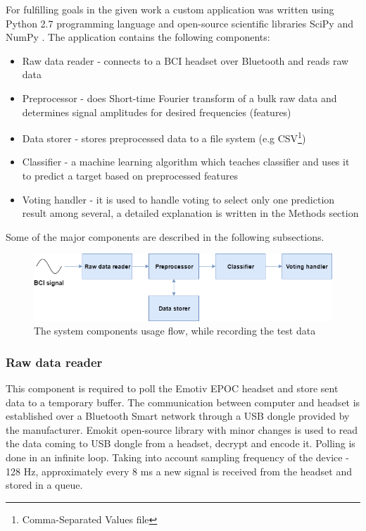 \documentclass[12pt]{article}
\theoremstyle{definition}
\begin{document}
For fulfilling goals in the given work a custom application was written using Python 2.7 programming language and open-source scientific libraries SciPy \cite{scipy} and NumPy \cite{numpy}. The application contains the following components:
\begin{itemize}
\item Raw data reader - connects to a BCI headset over Bluetooth and reads raw data
\item Preprocessor -  does Short-time Fourier transform of a bulk raw data and determines signal amplitudes for desired frequencies (features)
\item Data storer - stores preprocessed data to a file system (e.g CSV\footnote{Comma-Separated Values \cite{csv} file})
\item Classifier - a machine learning algorithm which teaches classifier and uses it to predict a target based on preprocessed features
\item Voting handler - it is used to handle voting to select only one prediction result among several, a detailed explanation is written in the Methods section
\end{itemize}

Some of the major components are described in the following subsections.
\begin{figure} [ht]
\begin{center}
\includegraphics[width=1\textwidth]{maga_application}
\caption{The system components usage flow, while recording the test data}
\label{fig:fnCompModel}
\end{center}
\end{figure}

\subsubsection{Raw data reader}

This component is required to poll the Emotiv EPOC headset and store sent data to a temporary buffer. The communication between computer and headset is established over a Bluetooth Smart network through a USB dongle provided by the manufacturer. Emokit \cite{emokit} open-source library with minor changes is used to read the data coming to USB dongle from a headset, decrypt and encode it. Polling is done in an infinite loop. Taking into account sampling frequency of the device - 128 Hz, approximately every 8 ms a new signal is received from the headset and stored in a queue.
\end{document}
